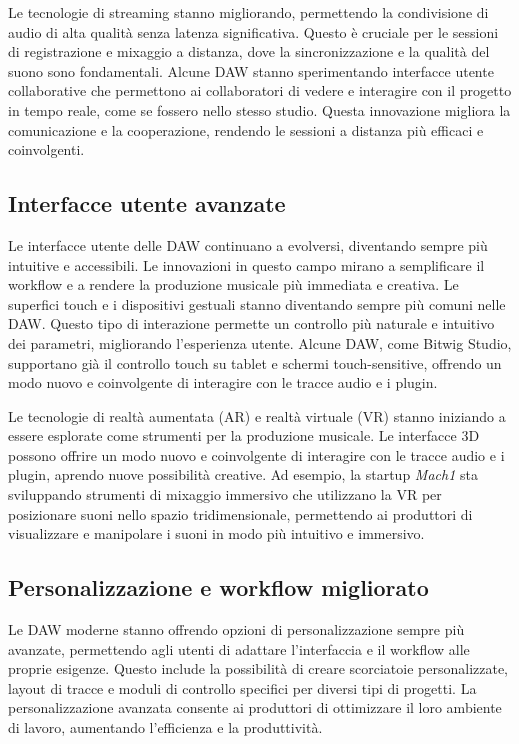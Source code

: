 \documentclass{book}
\begin{document}
Le tecnologie di streaming stanno migliorando, permettendo la condivisione di audio di alta qualità senza latenza significativa. Questo è cruciale per le sessioni di registrazione e mixaggio a distanza, dove la sincronizzazione e la qualità del suono sono fondamentali. Alcune DAW stanno sperimentando interfacce utente collaborative che permettono ai collaboratori di vedere e interagire con il progetto in tempo reale, come se fossero nello stesso studio. Questa innovazione migliora la comunicazione e la cooperazione, rendendo le sessioni a distanza più efficaci e coinvolgenti.

\subsection{Interfacce utente avanzate}

Le interfacce utente delle DAW continuano a evolversi, diventando sempre più intuitive e accessibili. Le innovazioni in questo campo mirano a semplificare il workflow e a rendere la produzione musicale più immediata e creativa. Le superfici touch e i dispositivi gestuali stanno diventando sempre più comuni nelle DAW. Questo tipo di interazione permette un controllo più naturale e intuitivo dei parametri, migliorando l’esperienza utente. Alcune DAW, come Bitwig Studio, supportano già il controllo touch su tablet e schermi touch-sensitive, offrendo un modo nuovo e coinvolgente di interagire con le tracce audio e i plugin.

Le tecnologie di realtà aumentata (AR) e realtà virtuale (VR) stanno iniziando a essere esplorate come strumenti per la produzione musicale. Le interfacce 3D possono offrire un modo nuovo e coinvolgente di interagire con le tracce audio e i plugin, aprendo nuove possibilità creative. Ad esempio, la startup \textit{Mach1} sta sviluppando strumenti di mixaggio immersivo che utilizzano la VR per posizionare suoni nello spazio tridimensionale, permettendo ai produttori di visualizzare e manipolare i suoni in modo più intuitivo e immersivo.

\subsection{Personalizzazione e workflow migliorato}

Le DAW moderne stanno offrendo opzioni di personalizzazione sempre più avanzate, permettendo agli utenti di adattare l’interfaccia e il workflow alle proprie esigenze. Questo include la possibilità di creare scorciatoie personalizzate, layout di tracce e moduli di controllo specifici per diversi tipi di progetti. La personalizzazione avanzata consente ai produttori di ottimizzare il loro ambiente di lavoro, aumentando l’efficienza e la produttività.
\end{document}
